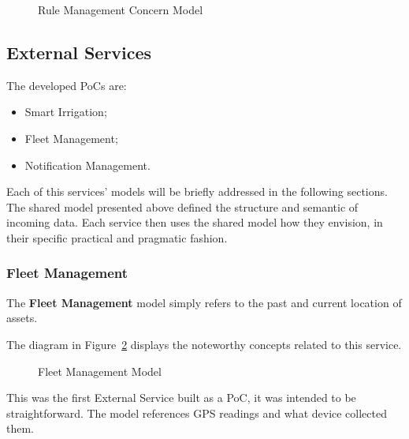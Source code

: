 \begin{figure}[H]
   \centering
  \resizebox{\columnwidth}{!}
  {
     
  }
  \caption[Rule Management Concern Model]{Rule Management Concern Model}
  \label{fig:design:domain:bounded_contexts:rule:diagram}
\end{figure}

\subsection{External Services}
\label{subsec:design:domain:services_contexts}

The developed \gls{PoC}s are:

\begin{itemize}
      \item Smart Irrigation;
      \item Fleet Management;
      \item Notification Management.
\end{itemize}

Each of this services' models will be briefly addressed in the following sections. The shared model presented above defined the structure and semantic of incoming data. Each service then uses the shared model how they envision, in their specific practical and pragmatic fashion.

\subsubsection{Fleet Management}
\label{subsubsec:design:domain:bounded_contexts:fleet}

The \textbf{Fleet Management} model simply refers to the past and current location of assets.

The diagram in Figure~\ref{fig:design:domain:bounded_contexts:fleet:diagram} displays the noteworthy concepts related to this service.

\begin{figure}[H]
   \centering
  \resizebox{\columnwidth}{!}
  {
     
  }
  \caption[Fleet Management Model]{Fleet Management Model}
  \label{fig:design:domain:bounded_contexts:fleet:diagram}
\end{figure}

This was the first External Service built as a \gls{PoC}, it was intended to be straightforward. The model references \gls{GPS} readings and what device collected them.

